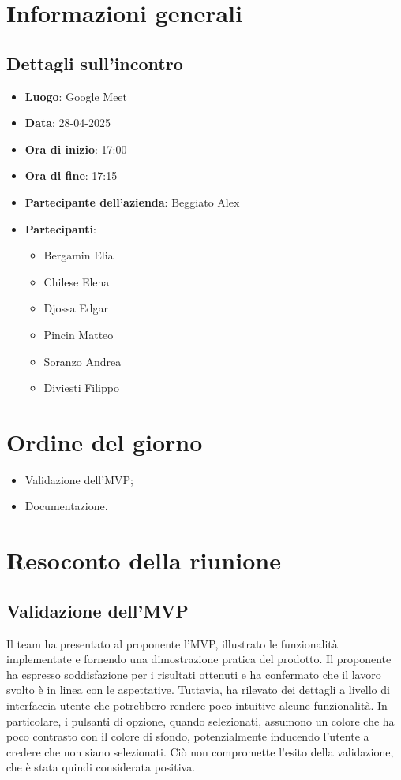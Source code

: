 \section{Informazioni generali}
\subsection{Dettagli sull'incontro}
\begin{itemize}
    \item \textbf{Luogo}: Google Meet
    \item \textbf{Data}: 28-04-2025
    \item \textbf{Ora di inizio}: 17:00
    \item \textbf{Ora di fine}: 17:15
    \item \textbf{Partecipante dell'azienda}: Beggiato Alex
    \item \textbf{Partecipanti}:
          \begin{itemize}
              \item Bergamin Elia
              \item Chilese Elena
              \item Djossa Edgar
              \item Pincin Matteo
              \item Soranzo Andrea
              \item Diviesti Filippo
          \end{itemize}
\end{itemize}

\section{Ordine del giorno}
\begin{itemize}
    \item Validazione dell'MVP;
    \item Documentazione.
\end{itemize}

\section{Resoconto della riunione}

\subsection{Validazione dell'MVP}
Il team ha presentato al proponente l'MVP, illustrato
le funzionalità implementate e fornendo una dimostrazione pratica del prodotto.
Il proponente ha espresso soddisfazione per i risultati ottenuti e ha
confermato che il lavoro svolto è in linea con le aspettative. Tuttavia, ha
rilevato dei dettagli a livello di interfaccia utente che potrebbero rendere
poco intuitive alcune funzionalità. In particolare, i pulsanti di opzione,
quando selezionati, assumono un colore che ha poco contrasto con il colore di
sfondo, potenzialmente inducendo l'utente a credere che non siano selezionati.
Ciò non compromette l'esito della validazione, che è stata quindi considerata
positiva.

